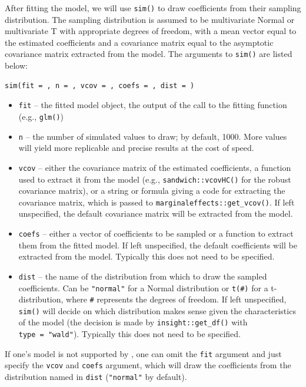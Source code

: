 After fitting the model, we will use \texttt{sim()} to draw coefficients from their sampling distribution. The sampling distribution is assumed to be multivariate Normal or multivariate T with appropriate degrees of freedom, with a mean vector equal to the estimated coefficients and a covariance matrix equal to the asymptotic covariance matrix extracted from the model. The arguments to \texttt{sim()} are listed below:

\begin{verbatim}
sim(fit = , n = , vcov = , coefs = , dist = )
\end{verbatim}

\begin{itemize}
\item
  \texttt{fit} -- the fitted model object, the output of the call to the fitting function (e.g., \texttt{glm()})
\item
  \texttt{n} -- the number of simulated values to draw; by default, 1000. More values will yield more replicable and precise results at the cost of speed.
\item
  \texttt{vcov} -- either the covariance matrix of the estimated coefficients, a function used to extract it from the model (e.g., \texttt{sandwich::vcovHC()} for the robust covariance matrix), or a string or formula giving a code for extracting the covariance matrix, which is passed to \texttt{marginaleffects::get\_vcov()}. If left unspecified, the default covariance matrix will be extracted from the model.
\item
  \texttt{coefs} -- either a vector of coefficients to be sampled or a function to extract them from the fitted model. If left unspecified, the default coefficients will be extracted from the model. Typically this does not need to be specified.
\item
  \texttt{dist} -- the name of the distribution from which to draw the sampled coefficients. Can be \texttt{"normal"} for a Normal distribution or \texttt{t(\#)} for a t-distribution, where \texttt{\#} represents the degrees of freedom. If left unspecified, \texttt{sim()} will decide on which distribution makes sense given the characteristics of the model (the decision is made by \texttt{insight::get\_df()} with \texttt{type\ =\ "wald"}). Typically this does not need to be specified.
\end{itemize}

If one's model is not supported by , one can omit the \texttt{fit} argument and just specify the \texttt{vcov} and \texttt{coefs} argument, which will draw the coefficients from the distribution named in \texttt{dist} (\texttt{"normal"} by default).

